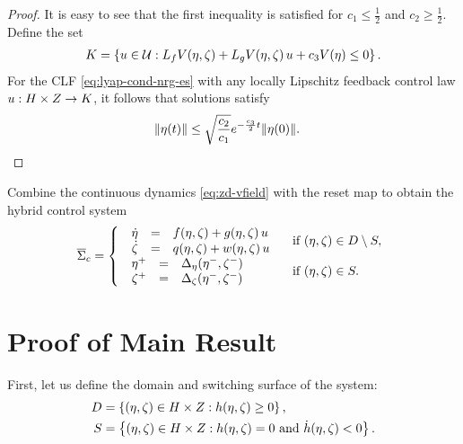 \documentclass[twocolumn]{article}
\begin{document}
\begin{proof}
  It is easy to see that the first inequality is satisfied for $c_{1} \leq \frac{1}{2}$ and $c_{2} \geq \frac{1}{2}$.
  Define the set
  \begin{align}
    K = \left\{ u \in \mathcal{U} : L_{f} V(\eta, \zeta) + L_{g} V(\eta, \zeta) \, u + c_{3} V(\eta) \leq 0 \right\}.
  \end{align}
  For the CLF \eqref{eq:lyap-cond-nrg-es} with any locally Lipschitz feedback control law $u : H \times Z \to K$, it follows that solutions satisfy
  \begin{align*}
    \| \eta(t) \| \leq \sqrt{\frac{c_{2}}{c_{1}}} e^{-\frac{c_{3}}{2} t} \| \eta(0) \|. & \qedhere
  \end{align*}
  
\end{proof}

Combine the continuous dynamics \eqref{eq:zd-vfield} with the reset map to obtain the hybrid control system
\begin{align}
  \label{eq:hcsys}
        {\overline {\Sigma}}_{c}= \left\{
        \begin{array}{l l}
          \begin{array}{r c l}
            {\dot \eta} &=& f(\eta, \zeta) + g(\eta, \zeta) \, u\\
            {\dot \zeta} &=& q(\eta, \zeta) + w(\eta, \zeta) \, u
          \end{array} & \mbox{ if } (\eta, \zeta) \in D \setminus S,\\
          \begin{array}{r c l}
            \eta^{+} &=& \Delta_{\eta}(\eta^{-}, \zeta^{-})\\
            \zeta^{+} &=& \Delta_{\zeta}(\eta^{-}, \zeta^{-})
          \end{array} & \mbox{ if } (\eta, \zeta) \in S.
        \end{array}\right.
\end{align}

\section{Proof of Main Result}

First, let us define the domain and switching surface of the system:
\begin{align}
  D &= \left\{ (\eta, \zeta) \in H \times Z : h(\eta, \zeta) \geq 0 \right\},\\
  \nonumber
  S &= \left\{ (\eta, \zeta) \in H \times Z : h(\eta, \zeta) = 0 \mbox{ and } {\dot h}(\eta, \zeta) < 0 \right\}.
\end{align}
\end{document}
